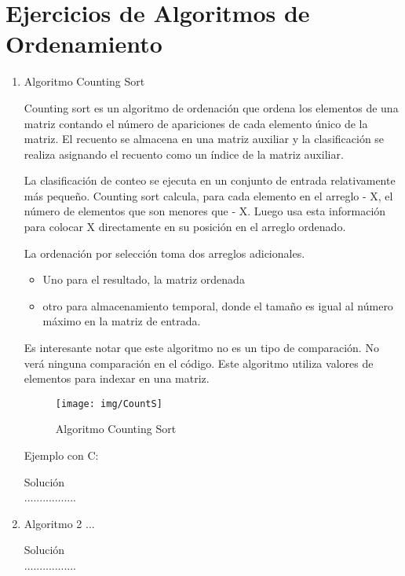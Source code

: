 \documentclass{article}
\begin{document}
	\section{Ejercicios de Algoritmos de Ordenamiento}\label{sec:ejercicios}
	\begin{enumerate}
		\item Algoritmo Counting Sort
		
			Counting sort es un algoritmo de ordenación que ordena los elementos de una matriz contando el número de apariciones de cada elemento único de la matriz. El recuento se almacena en una matriz auxiliar y la clasificación se realiza asignando el recuento como un índice de la matriz auxiliar.
			
La clasificación de conteo se ejecuta en un conjunto de entrada relativamente más pequeño. Counting sort calcula, para cada elemento en el arreglo - X, el número de elementos que son menores que - X. Luego usa esta información para colocar X directamente en su posición en el arreglo ordenado.

La ordenación por selección toma dos arreglos adicionales.

\begin{itemize}
   \item Uno para el resultado, la matriz ordenada
   \item otro para almacenamiento temporal, donde el tamaño es   igual al número máximo en la matriz de entrada.
 \end{itemize}	
 
 Es interesante notar que este algoritmo no es un tipo de comparación. No verá ninguna comparación en el código. Este algoritmo utiliza valores de elementos para indexar en una matriz.
		
\begin{figure}[H]
\centering
\texttt{[image: img/CountS]}
\caption{Algoritmo Counting Sort}
\label{fig:CountS}
\end{figure}

Ejemplo con C:








		
		Solución \\
		.................
		
		\item Algoritmo 2 ...
		
		Solución \\
		.................


\end{enumerate}
\end{document}
